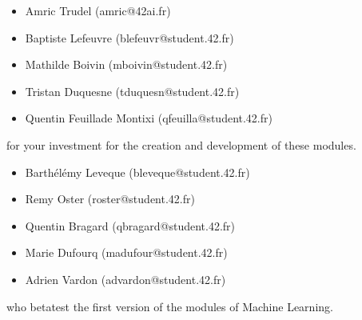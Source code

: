 \documentclass{42-en}
\begin{document}
\begin{itemize}
    \item Amric Trudel (amric@42ai.fr)
    \item Baptiste Lefeuvre (blefeuvr@student.42.fr)
    \item Mathilde Boivin (mboivin@student.42.fr)
    \item Tristan Duquesne (tduquesn@student.42.fr)
    \item Quentin Feuillade Montixi (qfeuilla@student.42.fr)
\end{itemize}
for your investment for the creation and development of these modules.

\begin{itemize}
    \item Barthélémy Leveque (bleveque@student.42.fr)
    \item Remy Oster (roster@student.42.fr)
    \item Quentin Bragard (qbragard@student.42.fr)
    \item Marie Dufourq (madufour@student.42.fr)
    \item Adrien Vardon (advardon@student.42.fr)
\end{itemize}
who betatest the first version of the modules of Machine Learning.
\vfill
\doclicenseThis
\end{document}
